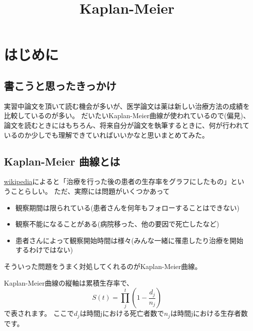 \documentclass[11pt]{article}
\title{Kaplan-Meier}
\providecommand{\tightlist}{%
      \setlength{\itemsep}{0pt}\setlength{\parskip}{0pt}}
\begin{document}
    
    
    \maketitle
    
    

    
    \hypertarget{ux306fux3058ux3081ux306b}{%
\section{はじめに}\label{ux306fux3058ux3081ux306b}}

    \hypertarget{ux66f8ux3053ux3046ux3068ux601dux3063ux305fux304dux3063ux304bux3051}{%
\subsection{書こうと思ったきっかけ}\label{ux66f8ux3053ux3046ux3068ux601dux3063ux305fux304dux3063ux304bux3051}}

    実習中論文を頂いて読む機会が多いが、医学論文は薬は新しい治療方法の成績を比較しているのが多い。
だいたいKaplan-Meier曲線が使われているので(偏見)、論文を読むときにはもちろん、将来自分が論文を執筆するときに、何が行われているのか少しでも理解できていればいいかなと思いまとめてみた。

    \hypertarget{kaplan-meier-ux66f2ux7ddaux3068ux306f}{%
\subsection{Kaplan-Meier
曲線とは}\label{kaplan-meier-ux66f2ux7ddaux3068ux306f}}

    \href{https://ja.wikipedia.org/wiki/\%E7\%94\%9F\%E5\%AD\%98\%E7\%8E\%87\%E6\%9B\%B2\%E7\%B7\%9A}{wikipedia}によると「治療を行った後の患者の生存率をグラフにしたもの」ということらしい。
ただ、実際には問題がいくつかあって

\begin{itemize}
\tightlist
\item
  観察期間は限られている(患者さんを何年もフォローすることはできない)
\item
  観察不能になることがある(病院移った、他の要因で死亡したなど)
\item
  患者さんによって観察開始時間は様々(みんな一緒に罹患したり治療を開始するわけではない)
\end{itemize}

そういった問題をうまく対処してくれるのがKaplan-Meier曲線。

    Kaplan-Meier曲線の縦軸は累積生存率で、 \[
  S(t) = \prod_{j}^t (1-\frac{d_j}{n_j})
\] で表されます。
ここで\(d_j\)は時間jにおける死亡者数で\(n_j\)は時間jにおける生存者数です。
\end{document}

